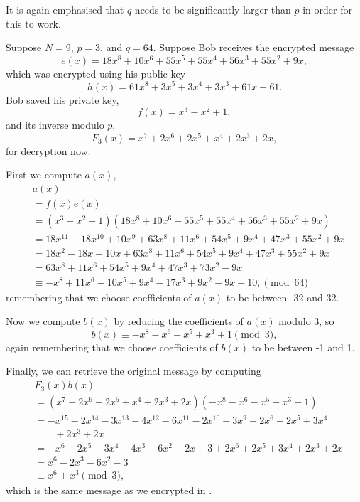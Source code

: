 It is again emphasised that $q$ needs to be significantly larger than $p$ in order for this to work.

\begin{example}
    Suppose $N = 9$, $p = 3$, and $q = 64$. Suppose Bob receives the encrypted message
    \[
        e(x) = 18x^8 + 10x^6 + 55x^5 + 55x^4 + 56x^3 + 55x^2 + 9x,
    \]
    which was encrypted using his public key
    \[
        h(x) = 61x^8 + 3x^5 + 3x^4 + 3x^3 + 61x + 61.
    \]
    Bob saved his private key,
    \[
        f(x) = x^3 - x^2 + 1,
    \]
    and its inverse modulo $p$,
    \[
        F_3(x) = x^7 + 2x^6 + 2x^5 +x^4 + 2x^3 + 2x,
    \]
    for decryption now.

    First we compute $a(x)$,
    \begin{align*}
        &a(x)\\
        &= f(x)e(x)\\
        &= (x^3 - x^2 + 1)(18x^8 + 10x^6 + 55x^5 + 55x^4 + 56x^3 + 55x^2 + 9x)\\
        &= 18x^{11} - 18x^{10} + 10x^9 + 63x^8 + 11x^6 + 54x^5 + 9x^4 + 47x^3 + 55x^2 + 9x\\
        &= 18x^2 - 18x + 10x + 63x^8 + 11x^6 + 54x^5 + 9x^4 + 47x^3 + 55x^2 + 9x\\
        &= 63x^8 + 11x^6 + 54x^5 + 9x^4 + 47x^3 + 73x^2 - 9x\\
        &\equiv -x^8 + 11x^6 - 10x^5 + 9x^4 - 17x^3 + 9x^2 - 9x + 10, \pmod{64}
    \end{align*}
    remembering that we choose coefficients of $a(x)$ to be between -32 and 32.

    Now we compute $b(x)$ by reducing the coefficients of $a(x)$ modulo 3, so
    \[
        b(x) \equiv -x^8 - x^6 - x^5 + x^3 + 1 \pmod{3},
    \]
    again remembering that we choose coefficients of $b(x)$ to be between -1 and 1.

    Finally, we can retrieve the original message by computing
    \begin{align*}
        &F_3(x)b(x)\\
        &= (x^7 + 2x^6 + 2x^5 +x^4 + 2x^3 + 2x)(-x^8 - x^6 - x^5 + x^3 + 1)\\
        &= -x^{15} - 2x^{14} - 3x^{13} - 4x^{12} - 6x^{11} - 2x^{10} - 3x^9 + 2x^6 + 2x^5 + 3x^4\\
        &\quad\quad + 2x^3 + 2x\\
        &= -x^6 - 2x^5 - 3x^4 - 4x^3 - 6x^2 - 2x - 3 + 2x^6 + 2x^5 + 3x^4 + 2x^3 + 2x\\
        &= x^6 - 2x^3 - 6x^2 - 3\\
        &\equiv x^6 + x^3 \pmod{3},
    \end{align*}
    which is the same message as we encrypted in .
\end{example}

